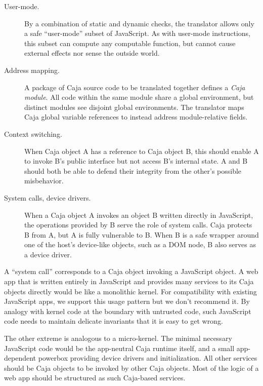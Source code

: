 \documentclass[letterpaper,twocolumn,10pt]{article}
\begin{document}
\begin{description}

  \item[User-mode.] By a combination of static and dynamic checks, the 
  translator allows only a safe ``user-mode'' subset of JavaScript. As with 
  user-mode instructions, this subset can compute any computable function, 
  but cannot cause external effects nor sense the outside world.

  \item[Address mapping.] A package of Caja source code to be translated 
  together defines a \emph{Caja module}. All code within the same module 
  share a global environment, but distinct modules see disjoint global 
  environments. The translator maps Caja global variable references to 
  instead address module-relative fields.

  \item[Context switching.] When Caja object A has a reference to Caja 
  object B, this should enable A to invoke B's public interface but not 
  access B's internal state. A and B should both be able to defend their 
  integrity from the other's possible misbehavior.

  \item[System calls, device drivers.] When a Caja object A invokes an 
  object B written directly in JavaScript, the operations provided by B serve 
  the role of system calls. Caja protects B from A, but A is fully 
  vulnerable to B. When B is a safe wrapper around one of the host's 
  device-like objects, such as a DOM node, B also serves as a device driver.

\end{description}

A ``system call'' corresponds to a Caja object invoking a JavaScript object. 
A web app that is written entirely in JavaScript and provides many services 
to its Caja objects directly would be like a monolithic kernel. For 
compatibility with existing JavaScript apps, we support this usage pattern 
but we don't recommend it. By analogy with kernel code at the boundary with 
untrusted code, such JavaScript code needs to maintain delicate invariants 
that it is easy to get wrong.

The other extreme is analogous to a micro-kernel. The minimal necessary 
JavaScript code would be the app-neutral Caja runtime itself, and a small 
app-dependent powerbox providing device drivers and initialization. All other 
services should be Caja objects to be invoked by other Caja objects. Most 
of the logic of a web app should be structured as such Caja-based services.
\end{document}
